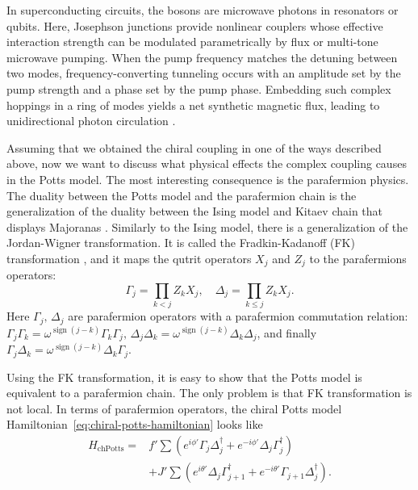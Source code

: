 \documentclass[reprint, aps, prx, amsmath, amssymb, longbibliography, superscriptaddress]{revtex4-2}
\DeclareMathOperator{\sgn}{sign}
\begin{document}
In superconducting circuits, the bosons are microwave photons in resonators or qubits. Here, Josephson junctions provide nonlinear couplers whose effective interaction strength can be modulated parametrically by flux or multi-tone microwave pumping. When the pump frequency matches the detuning between two modes, frequency-converting tunneling occurs with an amplitude set by the pump strength and a phase set by the pump phase. Embedding such complex hoppings in a ring of modes yields a net synthetic magnetic flux, leading to unidirectional photon circulation \cite{kapit_quantum_2013,sliwa_reconfigurable_2015,gu_microwave_2017, cao_parametrically_2024}.


Assuming that we obtained the chiral coupling in one of the ways described above, now we want to discuss what physical effects the complex coupling causes in the Potts model. The most interesting consequence is the parafermion physics. The duality between the Potts model and the parafermion chain is the generalization of the duality between the Ising model and Kitaev chain that displays Majoranas \cite{kitaev_unpaired_2001}. Similarly to the Ising model, there is a generalization of the Jordan-Wigner transformation. It is called the Fradkin-Kadanoff (FK) transformation \cite{fradkin_disorder_1980}, and it maps the qutrit operators $X_j$ and $ Z_j$ to the parafermions operators:
\begin{equation}
\Gamma_j = \prod\limits_{k<j} Z_k X_j , \quad \Delta_j = \prod\limits_{k\le j} Z_k X_j.
\end{equation}
Here $\Gamma_j, \, \Delta_j$ are parafermion operators with a parafermion commutation relation: $\Gamma_j \Gamma_k = \omega^{\sgn(j-k)} \Gamma_k \Gamma_j, \, \Delta_j \Delta_k = \omega^{\sgn(j-k)} \Delta_k \Delta_j$, and finally $\Gamma_j \Delta_k = \omega^{\sgn(j-k)} \Delta_k \Gamma_j$.

Using the FK transformation, it is easy to show that the Potts model is equivalent to a parafermion chain. The only problem is that FK transformation is not local. In terms of parafermion operators, the chiral Potts model Hamiltonian~\eqref{eq:chiral-potts-hamiltonian} looks like 
\begin{equation}
\begin{aligned}
    H_{\text{chPotts}} = &f' \sum \left( e^{i\phi'} \Gamma_j \Delta_j^{\dagger} + e^{-i\phi'} \Delta_j \Gamma_j^{\dagger}\right) \\
    &+J' \sum \left(e^{i\theta'} \Delta_j \Gamma_{j+1}^{\dagger} + e^{-i\theta'} \Gamma_{j+1} \Delta_j^{\dagger}\right).
\end{aligned}
\end{equation}
\end{document}
